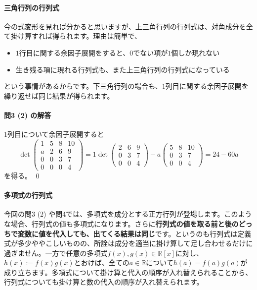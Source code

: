 \paragraph{三角行列の行列式}
今の式変形を見れば分かると思いますが、上三角行列の行列式は、対角成分を全て掛け算すれば得られます。理由は簡単で、
\begin{itemize}
\item $1$行目に関する余因子展開をすると、$0$でない項が$1$個しか現れない
\item 生き残る項に現れる行列式も、また上三角行列の行列式になっている
\end{itemize}
という事情があるからです。下三角行列の場合も、$1$列目に関する余因子展開を繰り返せば同じ結果が得られます。

\paragraph{問3 (2) の解答} $1$列目について余因子展開すると
\[
\det
\begin{pmatrix}
1 & 5 & 8 & 10 \\
a & 2 & 6 & 9 \\
0 & 0 & 3 & 7 \\
0 & 0 & 0 & 4
\end{pmatrix}
= 1 \det
\begin{pmatrix}
2 & 6 & 9 \\
0 & 3 & 7 \\
0 & 0 & 4
\end{pmatrix}
- a
\begin{pmatrix}
5 & 8 & 10 \\
0 & 3 & 7 \\
0 & 0 & 4
\end{pmatrix}
= 24 - 60a
\]
を得る。 \qed

\paragraph{多項式の行列式}

今回の問3 (2) や問4では、多項式を成分とする正方行列が登場します。このような場合、行列式の値も多項式になります。さらに\textbf{行列式の値を取る前と後のどっちで変数に値を代入しても、出てくる結果は同じ}です。というのも行列式は定義式が多少ややこしいものの、所詮は成分を適当に掛け算して足し合わせるだけに過ぎません。一方で任意の多項式$f(x), g(x) \in \mathbb{R}[x]$に対し、$h(x) := f(x)g(x)$とおけば、全ての$a \in \mathbb{R}$について$h(a) = f(a)g(a)$が成り立ちます。多項式について掛け算と代入の順序が入れ替えられることから、行列式についても掛け算と数の代入の順序が入れ替えられます。

